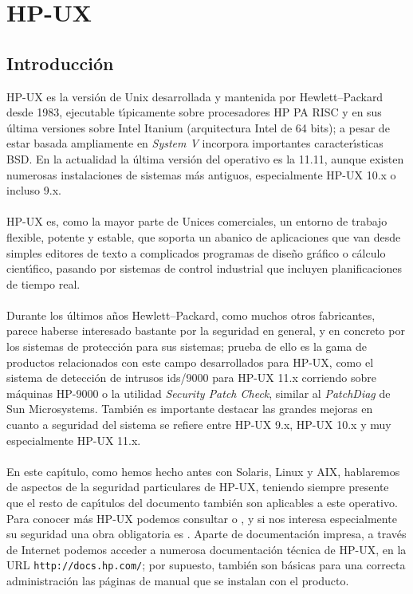 \chapter{HP-UX}
\section{Introducci\'on}
HP-UX es la versi\'on de Unix desarrollada y mantenida por Hewlett--Packard 
desde 1983, ejecutable t\'{\i}\-pi\-ca\-men\-te sobre procesadores HP PA RISC y 
en sus \'ultima versiones sobre Intel Itanium (arquitectura Intel de 64 bits); 
a pesar de estar basada ampliamente en {\it System V} incorpora importantes 
caracter\'{\i}sticas BSD. En la actualidad la \'ultima versi\'on del operativo 
es la 11.11, aunque existen numerosas instalaciones de sistemas m\'as antiguos, 
especialmente HP-UX 10.x o incluso 9.x.\\
\\HP-UX es, como la mayor parte de Unices comerciales, un entorno de trabajo
flexible, potente y estable, que soporta un abanico de aplicaciones que van
desde simples editores de texto a complicados programas de dise\~no gr\'afico o
c\'alculo cient\'{\i}fico, pasando por sistemas de control industrial que
incluyen planificaciones de tiempo real.\\
\\Durante los \'ultimos a\~nos Hewlett--Packard, como muchos otros fabricantes,
parece haberse interesado bastante por la seguridad en general, y en concreto
por los sistemas de protecci\'on para sus sistemas; prueba de ello es la gama
de productos relacionados con este campo desarrollados para HP-UX, como el
sistema de detecci\'on de intrusos {\sc ids/9000} para HP-UX 11.x corriendo 
sobre m\'aquinas HP-9000 o la utilidad {\it Security Patch Check}, similar al 
{\it PatchDiag} de Sun Microsystems. Tambi\'en es importante destacar las 
grandes mejoras en cuanto a seguridad del sistema se refiere entre HP-UX 9.x, 
HP-UX 10.x y muy especialmente HP-UX 11.x.\\
\\En este cap\'{\i}tulo, como hemos hecho antes con Solaris, Linux y AIX,
hablaremos de aspectos de la seguridad particulares de HP-UX, teniendo siempre
presente que el resto de cap\'{\i}tulos del documento tambi\'en son aplicables
a este operativo. Para conocer m\'as HP-UX podemos consultar \cite{kn:reh00} o
\cite{kn:pon01}, y si nos interesa especialmente su seguridad una obra 
obligatoria es \cite{kn:won01}. Aparte de documentaci\'on impresa, a trav\'es 
de Internet podemos acceder a numerosa documentaci\'on t\'ecnica de HP-UX, en 
la URL {\tt http://docs.hp.com/}; por supuesto, tambi\'en son b\'asicas para 
una correcta administraci\'on las p\'aginas de manual que se instalan con el 
producto.
